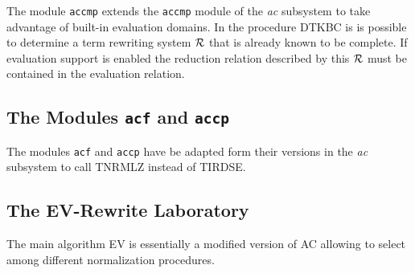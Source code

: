 The module {\tt accmp} extends the {\tt accmp} module of the {\it ac} subsystem
to take advantage of built-in evaluation domains.
In the procedure DTKBC is is possible to determine a term rewriting system
$\cal R$ that is already known to be complete.
If evaluation support is enabled the reduction relation described by this 
$\cal R$ must be contained in the evaluation relation.

\subsection{The Modules {\tt acf} and {\tt accp}}
 
The modules {\tt acf} and {\tt accp} have be adapted form their versions
in the {\it ac} subsystem to  call TNRMLZ instead of TIRDSE.

\subsection{The EV-Rewrite Laboratory}

The main algorithm EV is essentially a modified version of AC allowing to
select among different  normalization procedures.
